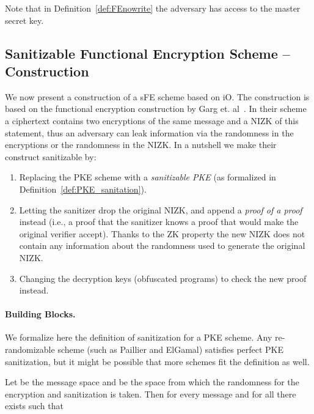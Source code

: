 \documentclass{llncs}
\begin{document}
Note that in Definition~\ref{def:FEnowrite} the adversary has access to the master secret key.
















\subsection{Sanitizable Functional Encryption Scheme -- Construction}\label{sec:sfecons}
We now present a construction of a sFE scheme based on iO. The construction is based on the functional encryption construction by Garg et. al~\cite{DBLP:conf/focs/GargGH0SW13}. In their scheme a ciphertext contains two encryptions of the same message and a NIZK of this statement, thus an adversary can leak information via the randomness in the encryptions or the randomness in the NIZK. In a nutshell we make their construct sanitizable by:
\begin{enumerate}
\item Replacing the PKE scheme with a \emph{sanitizable PKE} (as formalized in Definition~\ref{def:PKE_sanitation}).
\item Letting the sanitizer drop the original NIZK, and append a \emph{proof of a proof} instead (i.e., a proof that the sanitizer knows a proof that would make the original verifier accept). Thanks to the ZK property the new NIZK does not contain any information about the randomness used to generate the original NIZK.
\item Changing the decryption keys (obfuscated programs) to check the new proof instead.

\end{enumerate} 


\paragraph{Building Blocks.} We formalize here the definition of sanitization for a PKE scheme. Any re-randomizable scheme (such as Paillier and ElGamal) satisfies perfect PKE sanitization, but it might be possible that more schemes fit the definition as well.

\begin{defi} \label{def:PKE_sanitation}
Let  be the message space and  be the space from which the randomness for the encryption and sanitization is taken. 
Then for every message  and for all  there exists  such that

\end{defi}
\end{document}
